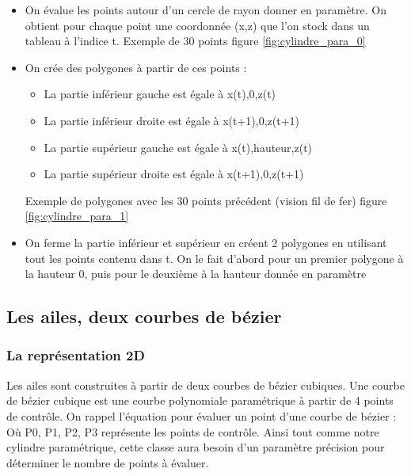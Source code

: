 \documentclass{article}
\begin{document}
\begin{itemize}
\item On évalue les points autour d'un cercle de rayon donner en paramètre. On obtient pour chaque point une coordonnée (x,z) que l'on stock dans un tableau à l'indice t. Exemple de 30 points figure \ref{fig:cylindre_para_0}
\item On crée des polygones à partir de ces points :
	\begin{itemize}
		\item La partie inférieur gauche est égale à x(t),0,z(t)
		\item La partie inférieur droite est égale à x(t+1),0,z(t+1)
		\item La partie supérieur gauche est égale à x(t),hauteur,z(t)
		\item La partie supérieur droite est égale à x(t+1),0,z(t+1)
	\end{itemize}
Exemple de polygones avec les 30 points précédent (vision fil de fer) figure \ref{fig:cylindre_para_1}
\item On ferme la partie inférieur et supérieur en créent 2 polygones en utilisant tout les points contenu dans t. On le fait d'abord pour un premier polygone à la hauteur 0, puis pour le deuxième à la hauteur donnée en paramètre
\end{itemize}


\subsection{Les ailes, deux courbes de bézier}

\subsubsection{La représentation 2D}

Les ailes sont construites à partir de deux courbes de bézier cubiques. Une courbe de bézier cubique est une courbe polynomiale paramétrique à partir de 4 points de contrôle. On rappel l'équation pour évaluer un point d'une courbe de bézier :
\equabezier
Où P0, P1, P2, P3 représente les points de contrôle. Ainsi tout comme notre cylindre paramétrique, cette classe aura besoin d'un paramètre précision pour déterminer le nombre de points à évaluer.
\end{document}

